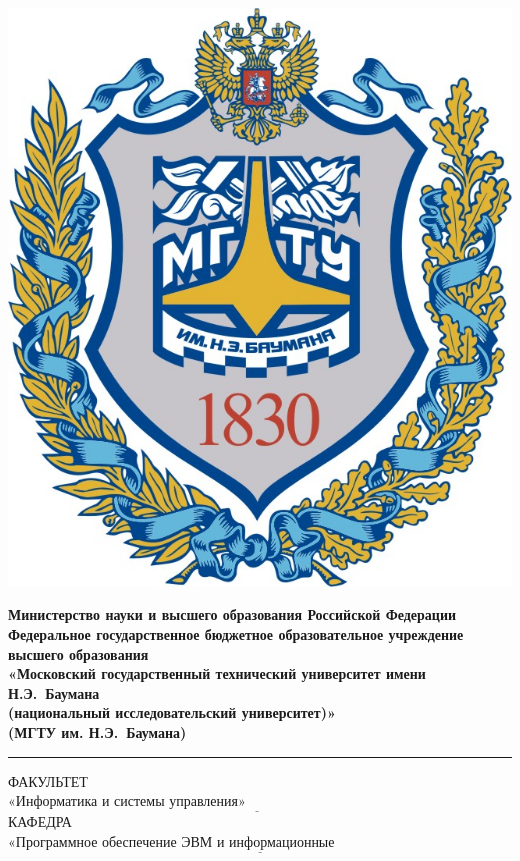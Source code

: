 \fontsize{12pt}{12pt}\selectfont
\noindent \begin{minipage}{0.15\textwidth}
	\includegraphics[width=\linewidth]{img/EmblemBMSTU.png}
\end{minipage}
\noindent\begin{minipage}{0.9\textwidth}\centering
	\textbf{Министерство науки и высшего образования Российской Федерации}\\
	\textbf{Федеральное государственное бюджетное образовательное учреждение высшего образования}\\
	\textbf{«Московский государственный технический университет имени Н.Э.~Баумана}\\
	\textbf{(национальный исследовательский университет)»}\\
	\textbf{(МГТУ им. Н.Э.~Баумана)}
\end{minipage}

\noindent\rule{18cm}{3pt}
\newline\newline
\noindent ФАКУЛЬТЕТ $\underline{\text{«Информатика и системы управления»~~~~~~~~~~~~~~~~~~~~~~~~~~~~~~~~~~~~~~~~~~~~~~~~~~~~~~~~}}$ \newline\newline
\noindent КАФЕДРА $\underline{\text{«Программное обеспечение ЭВМ и информационные технологии»~~~~~~~~~~~~~~~~~~~~~~~}}$\newline\newline\newline\newline\newline\newline\newline


